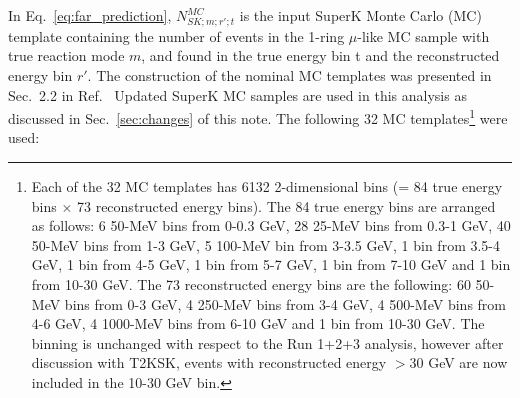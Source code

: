 In Eq.\ \ref{eq:far_prediction}, $N_{SK;m;r\prime;t}^{MC}$ is the input SuperK Monte Carlo (MC) template
containing the number of events in the 1-ring $\mu$-like MC sample with true reaction mode $m$,
and found in the true energy bin t and the reconstructed energy bin $r\prime$.
The construction of the nominal MC templates was presented in Sec.\ 2.2 in Ref.\ \cite{OurRun123DisappAnalysis3Flavour} 
Updated SuperK MC samples are used in this analysis as discussed in Sec.\ \ref{sec:changes} of this note.
The following 32 MC templates\footnote{
  Each of the 32 MC templates has 6132 2-dimensional bins (= 84 true energy bins $\times$ 73 reconstructed energy bins).
  The 84 true energy bins are arranged as follows:
    6  50-MeV bins from 0-0.3 GeV,
   28  25-MeV bins from 0.3-1 GeV,
   40  50-MeV bins from 1-3 GeV,
    5 100-MeV bin from 3-3.5 GeV,
    1 bin from 3.5-4 GeV,
    1 bin from 4-5 GeV,
    1 bin from 5-7 GeV,
    1 bin from 7-10 GeV and
    1 bin from 10-30 GeV.
The 73 reconstructed energy bins are the following:
    60   50-MeV bins from 0-3 GeV,
     4  250-MeV bins from 3-4 GeV,
     4  500-MeV bins from 4-6 GeV,
     4 1000-MeV bins from 6-10 GeV and
     1 bin from 10-30 GeV.
The binning is unchanged with respect to the Run 1+2+3 analysis,
however after discussion with T2KSK, events with reconstructed energy $>$30 GeV are now included in
the 10-30 GeV bin.
} were used:
